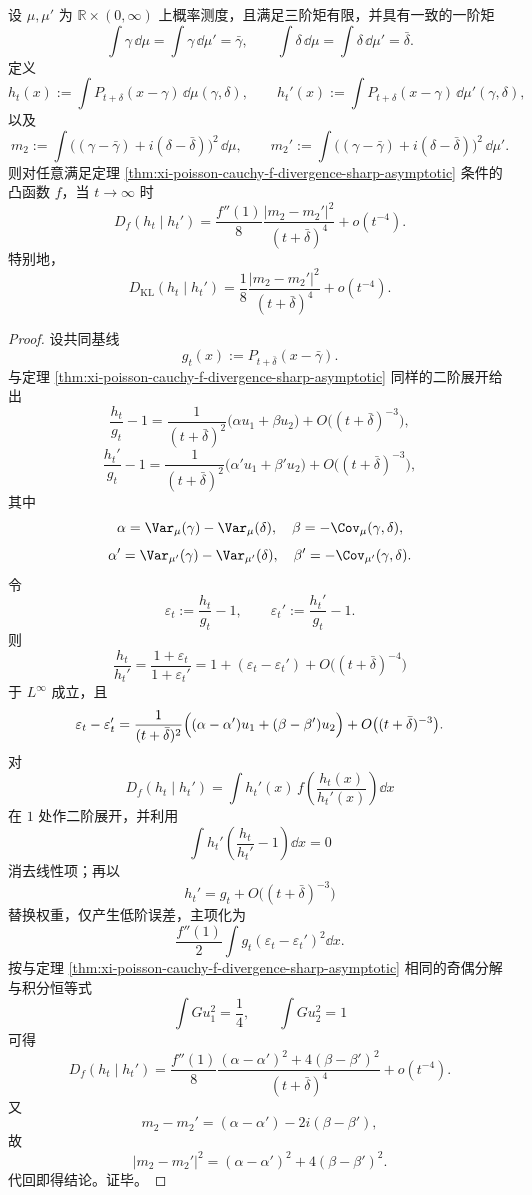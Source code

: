 \begin{theorem}[双缺陷构型在强粗粒化下的可分辨首项]\label{thm:xi-poisson-cauchy-two-mixtures-distinguishability}
设 \(\mu,\mu'\) 为 \(\mathbb R\times(0,\infty)\) 上概率测度，且满足三阶矩有限，并具有一致的一阶矩
\[
\int \gamma\,\dd\mu=\int \gamma\,\dd\mu'=\bar\gamma,
\qquad
\int \delta\,\dd\mu=\int \delta\,\dd\mu'=\bar\delta.
\]
定义
\[
h_t(x):=\int P_{t+\delta}(x-\gamma)\,\dd\mu(\gamma,\delta),
\qquad
h_t'(x):=\int P_{t+\delta}(x-\gamma)\,\dd\mu'(\gamma,\delta),
\]
以及
\[
m_2:=\int\bigl((\gamma-\bar\gamma)+i(\delta-\bar\delta)\bigr)^2\,\dd\mu,
\qquad
m_2':=\int\bigl((\gamma-\bar\gamma)+i(\delta-\bar\delta)\bigr)^2\,\dd\mu'.
\]
则对任意满足定理 \ref{thm:xi-poisson-cauchy-f-divergence-sharp-asymptotic} 条件的凸函数 \(f\)，当 \(t\to\infty\) 时
\[
D_f(h_t\mid h_t')
=\frac{f''(1)}{8}\frac{|m_2-m_2'|^2}{(t+\bar\delta)^4}
+o(t^{-4}).
\]
特别地，
\[
D_{\mathrm{KL}}(h_t\mid h_t')
=\frac{1}{8}\frac{|m_2-m_2'|^2}{(t+\bar\delta)^4}
+o(t^{-4}).
\]
\end{theorem}
\begin{proof}
设共同基线
\[
g_t(x):=P_{t+\bar\delta}(x-\bar\gamma).
\]
与定理 \ref{thm:xi-poisson-cauchy-f-divergence-sharp-asymptotic} 同样的二阶展开给出
\[
\frac{h_t}{g_t}-1
=\frac{1}{(t+\bar\delta)^2}\bigl(\alpha u_1+\beta u_2\bigr)
+O\bigl((t+\bar\delta)^{-3}\bigr),
\]
\[
\frac{h_t'}{g_t}-1
=\frac{1}{(t+\bar\delta)^2}\bigl(\alpha' u_1+\beta' u_2\bigr)
+O\bigl((t+\bar\delta)^{-3}\bigr),
\]
其中
\[
\alpha=\Var_\mu(\gamma)-\Var_\mu(\delta),\quad
\beta=-\Cov_\mu(\gamma,\delta),
\]
\[
\alpha'=\Var_{\mu'}(\gamma)-\Var_{\mu'}(\delta),\quad
\beta'=-\Cov_{\mu'}(\gamma,\delta).
\]
令
\[
\varepsilon_t:=\frac{h_t}{g_t}-1,\qquad
\varepsilon_t':=\frac{h_t'}{g_t}-1.
\]
则
\[
\frac{h_t}{h_t'}
=\frac{1+\varepsilon_t}{1+\varepsilon_t'}
=1+(\varepsilon_t-\varepsilon_t')+O\bigl((t+\bar\delta)^{-4}\bigr)
\]
于 \(L^\infty\) 成立，且
\[
\varepsilon_t-\varepsilon_t'
=\frac{1}{(t+\bar\delta)^2}
\Bigl((\alpha-\alpha')u_1+(\beta-\beta')u_2\Bigr)
+O\bigl((t+\bar\delta)^{-3}\bigr).
\]
对
\[
D_f(h_t\mid h_t')=\int h_t'(x)\,f\!\left(\frac{h_t(x)}{h_t'(x)}\right)\dd x
\]
在 \(1\) 处作二阶展开，并利用
\[
\int h_t'\!\left(\frac{h_t}{h_t'}-1\right)\dd x=0
\]
消去线性项；再以
\[
h_t'=g_t+O\bigl((t+\bar\delta)^{-3}\bigr)
\]
替换权重，仅产生低阶误差，主项化为
\[
\frac{f''(1)}{2}\int g_t(\varepsilon_t-\varepsilon_t')^2\dd x.
\]
按与定理 \ref{thm:xi-poisson-cauchy-f-divergence-sharp-asymptotic} 相同的奇偶分解与积分恒等式
\[
\int G u_1^2=\frac14,\qquad \int G u_2^2=1
\]
可得
\[
D_f(h_t\mid h_t')
=\frac{f''(1)}{8}\frac{(\alpha-\alpha')^2+4(\beta-\beta')^2}{(t+\bar\delta)^4}
+o(t^{-4}).
\]
又
\[
m_2-m_2'=(\alpha-\alpha')-2i(\beta-\beta'),
\]
故
\[
|m_2-m_2'|^2=(\alpha-\alpha')^2+4(\beta-\beta')^2.
\]
代回即得结论。证毕。
\end{proof}

\endinput
